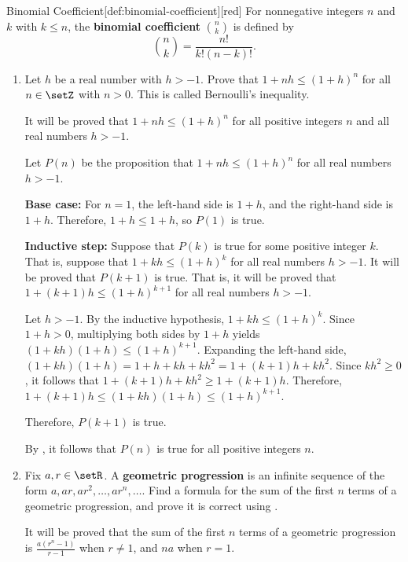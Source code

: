 \newpage
\begin{define}{Binomial Coefficient}[def:binomial-coefficient][red]
  For nonnegative integers \(n\) and \(k\) with \(k \leq n\), the \textbf{binomial coefficient} \(\binom{n}{k}\) is defined by
  \[
  \binom{n}{k} = \frac{n!}{k!(n-k)!}.
  \]
\end{define}

\begin{enumerate}
  \item Let \(h\) be a real number with \(h > -1\).
  Prove that \(1 + n h \leq (1 + h)^{n}\) for all \(n \in \setZ\) with \(n > 0\).
  This is called Bernoulli's inequality.
  \begin{subprove}
    It will be proved that \(1 + n h \leq (1 + h)^{n}\) for all positive integers \(n\) and all real numbers \(h > -1\).
    
    Let \(P(n)\) be the proposition that \(1 + n h \leq (1 + h)^{n}\) for all real numbers \(h > -1\).
    
    \textbf{Base case:} For \(n = 1\), the left-hand side is \(1 + h\), and the right-hand side is \(1 + h\).
    Therefore, \(1 + h \leq 1 + h\), so \(P(1)\) is true.
    
    \textbf{Inductive step:} Suppose that \(P(k)\) is true for some positive integer \(k\).
    That is, suppose that \(1 + k h \leq (1 + h)^{k}\) for all real numbers \(h > -1\).
    It will be proved that \(P(k+1)\) is true.
    That is, it will be proved that \(1 + (k+1) h \leq (1 + h)^{k+1}\) for all real numbers \(h > -1\).
    
    Let \(h > -1\).
    By the inductive hypothesis, \(1 + k h \leq (1 + h)^{k}\).
    Since \(1 + h > 0\), multiplying both sides by \(1 + h\) yields \((1 + k h)(1 + h) \leq (1 + h)^{k+1}\).
    Expanding the left-hand side, \((1 + k h)(1 + h) = 1 + h + k h + k h^{2} = 1 + (k+1) h + k h^{2}\).
    Since \(k h^{2} \geq 0\), it follows that \(1 + (k+1) h + k h^{2} \geq 1 + (k+1) h\).
    Therefore, \(1 + (k+1) h \leq (1 + k h)(1 + h) \leq (1 + h)^{k+1}\).
    
    Therefore, \(P(k+1)\) is true.
    
    By , it follows that \(P(n)\) is true for all positive integers \(n\).
  \end{subprove}
  \item Fix \(a, r \in \setR\).
  A \textbf{geometric progression} is an infinite sequence of the form \(a, a r, a r^{2}, \ldots, a r^{n}, \ldots\).
  Find a formula for the sum of the first \(n\) terms of a geometric progression, and prove it is correct using .
  \begin{subprove}
    It will be proved that the sum of the first \(n\) terms of a geometric progression is \(\frac{a(r^{n} - 1)}{r - 1}\) when \(r \neq 1\), and \(n a\) when \(r = 1\).
    

\end{subprove}
\end{enumerate}

